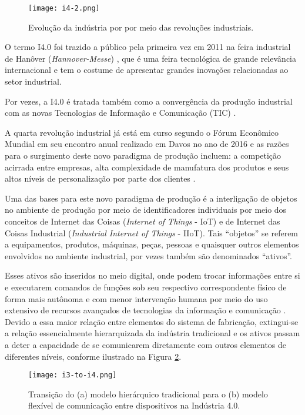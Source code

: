 	\begin{figure}[H]
		\centering
		\caption{Evolução da indústria por por meio das revoluções industriais.}
		\texttt{[image: i4-2.png]}
		\label{fig:i4-2}
	\end{figure}

	O termo I4.0 foi trazido a público pela primeira vez em 2011 na feira industrial de Hanôver (\textit{Hannover-Messe}) \cite{kagermann2011industrie}, que é uma feira tecnológica de grande relevância internacional e tem o costume de apresentar grandes inovações relacionadas ao setor industrial.

	Por vezes, a I4.0 é tratada também como a convergência da produção industrial com as novas Tecnologias de Informação e Comunicação (TIC) \cite{hermann2016design}.

	A quarta revolução industrial já está em curso segundo o Fórum Econômico Mundial \cite{schwab2016fourth} em seu encontro anual realizado em Davos no ano de 2016 e as razões para o surgimento deste novo paradigma de produção incluem: a competição acirrada entre empresas, alta complexidade de manufatura dos produtos e seus altos níveis de personalização por parte dos clientes \cite{bordeleau2018bi, vaidya2018industryfour}.

	Uma das bases para este novo paradigma de produção é a interligação de objetos no ambiente de produção por meio de identificadores individuais por meio dos conceitos de Internet das Coisas (\textit{Internet of Things} - IoT) e de Internet das Coisas Industrial (\textit{Industrial Internet of Things} - IIoT). Tais ``objetos'' se referem a equipamentos, produtos, máquinas, peças, pessoas e quaisquer outros elementos envolvidos no ambiente industrial, por vezes também são denominados ``ativos''.
	
	Esses ativos são inseridos no meio digital, onde podem trocar informações entre si e executarem comandos de funções sob seu respectivo correspondente físico de forma mais autônoma e com menor intervenção humana por meio do uso extensivo de recursos avançados de tecnologias da informação e comunicação \cite{adolph2018roadmap}. Devido a essa maior relação entre elementos do sistema de fabricação, extingui-se a relação essencialmente hierarquizada da indústria tradicional e os ativos passam a deter a capacidade de se comunicarem diretamente com outros elementos de diferentes níveis, conforme ilustrado na Figura \ref{fig:i3-to-i4}.
	
	\begin{figure}[H]
		\centering
		\caption{Transição do (a) modelo hierárquico tradicional para o (b) modelo flexível de comunicação entre dispositivos na Indústria 4.0.}
		\texttt{[image: i3-to-i4.png]}
		\label{fig:i3-to-i4}
	\end{figure}

